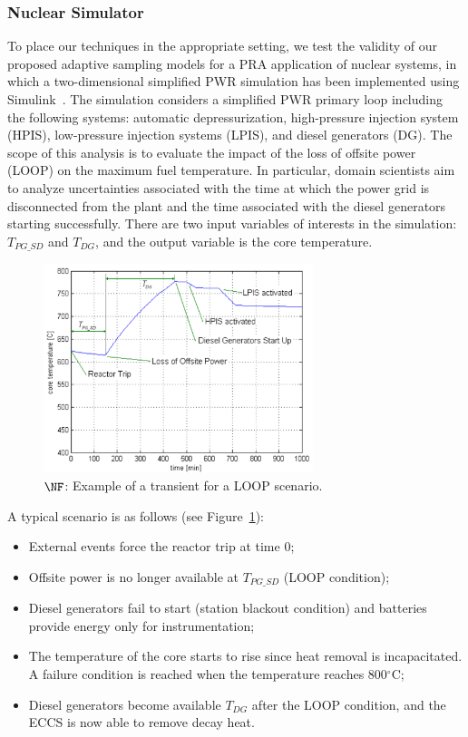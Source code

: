 
\subsubsection{Nuclear Simulator}

To place our techniques in the appropriate setting, we test the validity of our proposed adaptive sampling models for a PRA application of nuclear systems, in which a two-dimensional simplified PWR simulation has been implemented using Simulink~\cite{MandelliSmith2012}.
%
The simulation considers a simplified PWR primary loop including the following systems: automatic depressurization, high-pressure injection system (HPIS), low-pressure injection systems (LPIS), and diesel generators (DG).
%
The scope of this analysis is to evaluate the impact of the loss of offsite power (LOOP) on the maximum fuel temperature.
%
In particular, domain scientists aim to analyze uncertainties associated with the time at which the power grid is disconnected from the plant and the time associated with the diesel generators starting successfully.
%
There are two input variables of interests in the simulation: $T_{PG\_SD}$ and $T_{DG}$, and the output variable is the core temperature.

\begin{figure}[t]
  \centering
  \includegraphics[width=0.7\textwidth]{figs/chap5/scenExample.pdf}
  \caption[Example of a transient for a LOOP scenario]{$\protect\NF$: Example of a transient for a LOOP scenario.}
  \label{fig:nuclearTransient}
\end{figure}

A typical scenario is as follows (see Figure~\ref{fig:nuclearTransient}):
\begin{itemize} \denselist
  \item External events force the reactor trip at time $0$;
  \item Offsite power is no longer available at $T_{PG\_SD}$ (LOOP condition);
  \item Diesel generators fail to start (station blackout condition) and batteries provide energy only for instrumentation;
  \item The temperature of the core starts to rise since heat removal is incapacitated. A failure condition is reached when the temperature reaches 800$^{\circ}$C;
  \item Diesel generators become available $T_{DG}$ after the LOOP condition, and the ECCS is now able to remove decay heat.
\end{itemize}


